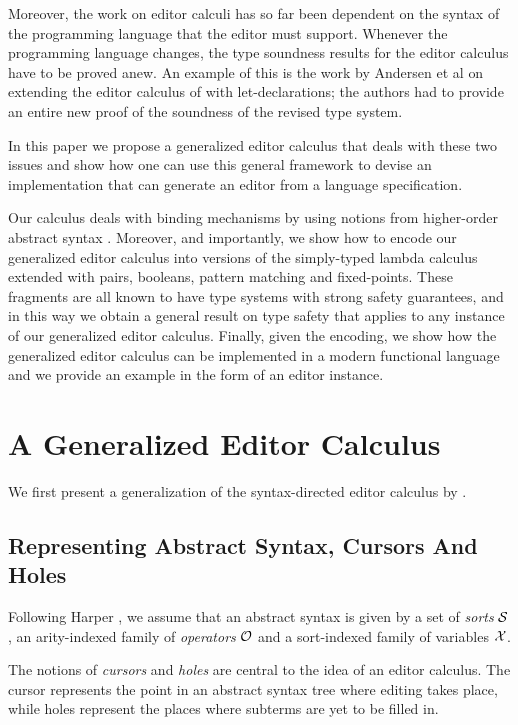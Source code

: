 \documentclass[sigplan]{acmart}
\begin{document}
Moreover, the work on editor calculi has so far been dependent on the
syntax of the programming language that the editor must
support. Whenever the programming language changes, the type soundness
results for the editor calculus have to be proved anew. An example of
this is the work by Andersen et al \cite{10.1145/3587216.3587221} on
extending the editor calculus of \cite{type_safe_structure_editor}
with let-declarations; the authors had to provide an entire new proof
of the soundness of the revised type system.

In this paper we propose a generalized editor calculus that deals with
these two issues and show how one can use this general framework to
devise an implementation that can generate an editor from a language
specification.

Our calculus deals with binding mechanisms by using notions from
higher-order abstract syntax \cite{hoas}. Moreover, and importantly,
we show how to encode our generalized editor calculus into versions of
the simply-typed lambda calculus extended with pairs, booleans,
pattern matching and fixed-points. These fragments are all known to
have type systems with strong safety guarantees, and in this way we
obtain a general result on type safety that applies to any instance of
our generalized editor calculus. Finally, given the encoding, we show
how the generalized editor calculus can be implemented in a modern
functional language and we provide an example in the form of an editor 
instance.

\section{A Generalized Editor Calculus}\label{sec:general_editor}

We first present a generalization of the syntax-directed editor
calculus by \cite{type_safe_structure_editor}.

\subsection{Representing Abstract Syntax, Cursors And Holes}

Following Harper \cite{harper_foundations}, we assume that an abstract
syntax is given by a set of \emph{sorts} $\mathcal{S}$, an arity-indexed
family of \emph{operators} $\mathcal{O}$ and a sort-indexed family of
variables $\mathcal{X}$.

The notions of \emph{cursors} and \emph{holes} are central to the idea
of an editor calculus. The cursor represents the point in an abstract
syntax tree where editing takes place, while holes represent the
places where subterms are yet to be filled in.
\end{document}

